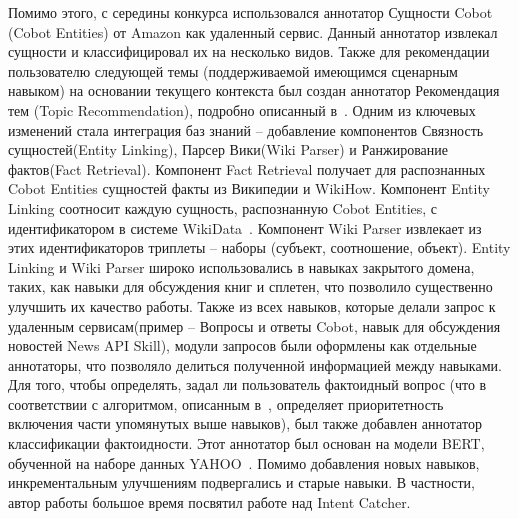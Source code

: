 Помимо этого, с середины конкурса использовался аннотатор Сущности Cobot (Cobot Entities) от Amazon как удаленный сервис. Данный аннотатор извлекал сущности и классифицировал их на несколько видов.
Также для рекомендации пользователю следующей темы (поддерживаемой имеющимся сценарным навыком) на основании текущего контекста был создан аннотатор Рекомендация тем (Topic Recommendation), подробно описанный в~\cite{dream2}.
Одним из ключевых изменений стала интеграция баз знаний -- добавление компонентов Связность сущностей(Entity Linking), Парсер Вики(Wiki Parser) и Ранжирование фактов(Fact Retrieval). Компонент Fact Retrieval получает для распознанных Cobot Entities сущностей факты из Википедии и WikiHow\cite{wikihow}.  Компонент Entity Linking соотносит каждую сущность, распознанную Cobot Entities, с идентификатором в системе WikiData~\cite{vrandei_2014}. Компонент Wiki Parser извлекает из этих идентификаторов триплеты -- наборы (субъект, соотношение, объект). Entity Linking и Wiki Parser широко использовались в навыках закрытого домена, таких, как навыки для обсуждения книг и сплетен, что позволило существенно улучшить их качество работы.
Также из всех навыков, которые делали запрос к удаленным сервисам(пример -- Вопросы и ответы Cobot, навык для обсуждения новостей News API Skill), модули запросов были оформлены как отдельные аннотаторы, что позволяло делиться полученной информацией между навыками.
Для того, чтобы определять, задал ли пользователь фактоидный вопрос (что в соответствии с алгоритмом, описанным в~\cite{dream2}, определяет приоритетность включения части упомянутых выше навыков), был также добавлен аннотатор классификации фактоидности. Этот аннотатор был основан на модели BERT, обученной на наборе данных YAHOO~\cite{yahoo_dataset}.
Помимо добавления новых навыков, инкрементальным улучшениям подвергались и старые навыки. В частности, автор работы большое время посвятил работе над Intent Catcher. 

